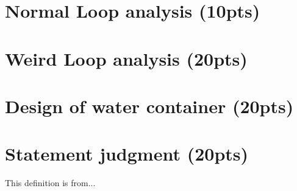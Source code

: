 \documentclass{article}[12pt]
\begin{document}
\newpage
\section{Normal Loop analysis (10pts)}

\newpage
\section{Weird Loop analysis (20pts)}

\newpage
\section{Design of water container (20pts)}

\newpage
\section{Statement judgment (20pts)}

\newpage
\begin{thebibliography}{99}
 This definition is from...
\end{thebibliography}
\end{document}
